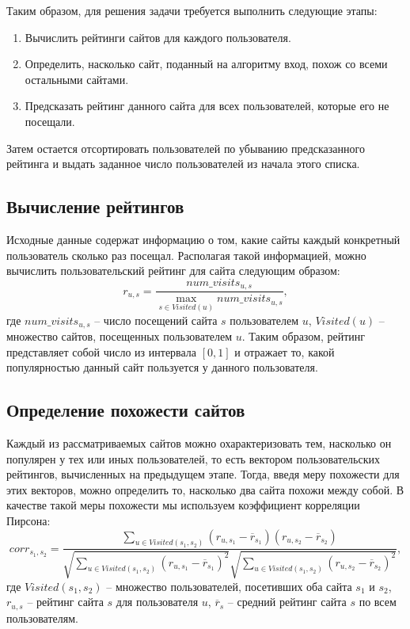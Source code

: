 \documentclass[12pt,a4paper]{report}
\newcommand*\mean[1]{\overline{#1}}
\begin{document}
Таким образом, для решения задачи требуется выполнить следующие этапы:
\begin{enumerate}
\setlength\itemsep{0em}
\item Вычислить рейтинги сайтов для каждого пользователя.
\item Определить, насколько сайт, поданный на алгоритму вход, похож со всеми остальными сайтами.
\item Предсказать рейтинг данного сайта для всех пользователей, которые его не посещали.
\end{enumerate}
Затем остается отсортировать пользователей по убыванию предсказанного рейтинга и выдать заданное число пользователей из начала этого списка.

\subsection{Вычисление рейтингов} 

Исходные данные содержат информацию о том, какие сайты каждый конкретный пользователь сколько раз посещал. Располагая такой информацией, можно вычислить пользовательский рейтинг для сайта следующим образом:
\begin{equation}
r_{u,s} = \frac{num\_visits_{u,s}}{  \max\limits_{s \in Visited(u)} num\_visits_{u,s}} ,
\end{equation}
где $num\_visits_{u,s}$ -- число посещений сайта $s$ пользователем $u$, $Visited(u)$ -- множество сайтов, посещенных пользователем $u$. Таким образом, рейтинг представляет собой число из интервала $[0,1]$ и отражает то, какой популярностью данный сайт пользуется у данного пользователя.

\subsection{Определение похожести сайтов} 

Каждый из рассматриваемых сайтов можно охарактеризовать тем, насколько он популярен у тех или иных пользователей, то есть вектором пользовательских рейтингов, вычисленных на предыдущем этапе. Тогда, введя меру похожести для этих векторов, можно определить то, насколько два сайта похожи между собой. В качестве такой меры похожести мы используем коэффициент корреляции Пирсона: 
\begin{equation}
corr_{s_1, s_2} = \frac{ \sum\limits_{u \in Visited(s_1, s_2)} (r_{u,s_1} -  \mean{r}_{s_1}) (r_{u,s_2} -  \mean{r}_{s_2}) }
{ \sqrt{ \sum\limits_{u \in Visited(s_1, s_2)} (r_{u,s_1} -  \mean{r}_{s_1})^2 } \sqrt { \sum\limits_{u \in Visited(s_1, s_2)} (r_{u,s_2} -  \mean{r}_{s_2})^2 } },
\end{equation}
где $Visited(s_1, s_2)$ -- множество пользователей, посетивших оба сайта $s_1$ и $s_2$, $r_{u,s}$ -- рейтинг сайта $s$ для пользователя $u$, $\mean{r}_{s}$ -- средний рейтинг сайта $s$ по всем пользователям.
\end{document}
